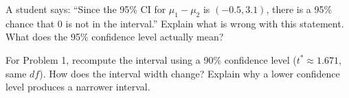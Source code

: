\documentclass[10pt]{article}
\begin{document}
\begin{reflectionbox}
A student says: ``Since the 95\% CI for $\mu_1 - \mu_2$ is $(-0.5, 3.1)$, there is a 95\%
chance that 0 is not in the interval.'' Explain what is wrong with this statement. What does
the 95\% confidence level actually mean?
\end{reflectionbox}

\begin{extensionbox}
For Problem 1, recompute the interval using a 90\% confidence level ($t^* \approx 1.671$,
same $df$). How does the interval width change? Explain why a lower confidence level produces
a narrower interval.
\end{extensionbox}
\end{document}

